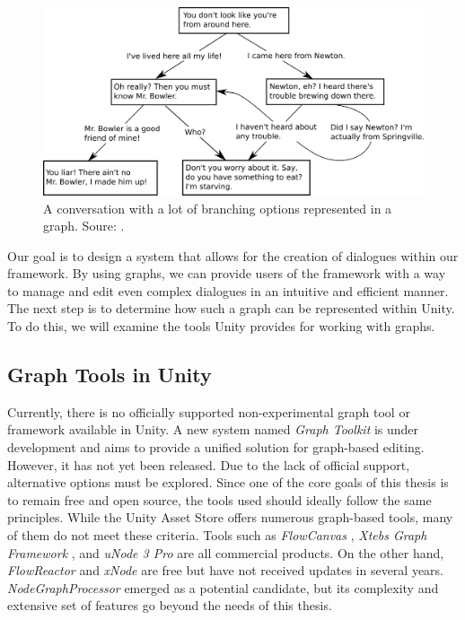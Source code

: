 \begin{figure}[H]
\centering
\includegraphics[width=.8\linewidth]{img/image_2025-06-02_133436738.png}
\caption{A conversation with a lot of branching options represented in a graph. Soure: \cite{wiki:DialogueGraph}.}
\label{fig:DialogueGraph}
\end{figure}

Our goal is to design a system that allows for the creation of dialogues within our framework. By using graphs, we can provide users of the framework with a way to manage and edit even complex dialogues in an intuitive and efficient manner. The next step is to determine how such a graph can be represented within Unity. To do this, we will examine the tools Unity provides for working with graphs. 

\subsection{Graph Tools in Unity}
Currently, there is no officially supported non-experimental graph tool or framework available in Unity. A new system named \textit{Graph Toolkit}  \cite{Unity-GraphToolkit} is under development and aims to provide a unified solution for graph-based editing. However, it has not yet been released. Due to the lack of official support, alternative options must be explored. Since one of the core goals of this thesis is to remain free and open source, the tools used should ideally follow the same principles. While the Unity Asset Store offers numerous graph-based tools, many of them do not meet these criteria. Tools such as \textit{FlowCanvas} \cite{FlowCanvas}, \textit{Xtebs Graph Framework} \cite{XtebsGraphFramework}, and \textit{uNode 3 Pro} \cite{uNode3Pro} are all commercial products. On the other hand, \textit{FlowReactor} \cite{FlowReactor} and \textit{xNode} \cite{xNode} are free but have not received updates in several years. \textit{NodeGraphProcessor} \cite{NodeGraphProcessor} emerged as a potential candidate, but its complexity and extensive set of features go beyond the needs of this thesis.

